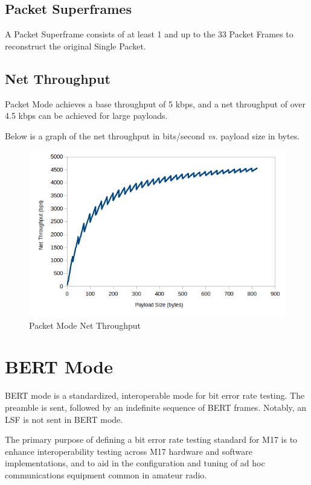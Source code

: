 \documentclass[a4paper,11pt,oneside]{book}
\begin{document}
\subsection{Packet Superframes}

A Packet Superframe consists of at least 1 and up to the 33 Packet Frames to reconstruct the original Single Packet.

\subsection{Net Throughput}

Packet Mode achieves a base throughput of 5 kbps, and a net throughput of over 4.5 kbps can be achieved for large payloads.

Below is a graph of the net throughput in bits/second \textit{vs.} payload size in bytes.

\begin{figure}[H]
	\centering
	\includegraphics[scale=0.7]{img/pm_thruput.png}
	\caption{Packet Mode Net Throughput}
\end{figure}

\section{BERT Mode}

BERT mode is a standardized, interoperable mode for bit error rate testing. The preamble is sent, followed by an indefinite sequence of BERT frames. Notably, an LSF is not sent in BERT mode.

The primary purpose of defining a bit error rate testing standard for M17 is to enhance interoperability testing across M17 hardware and software implementations, and to aid in the configuration and tuning of ad hoc communications equipment common in amateur radio.
\end{document}
